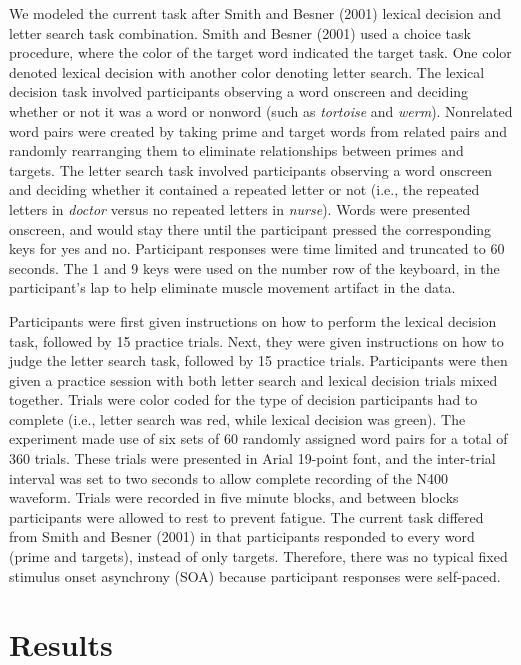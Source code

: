 \documentclass[english,man]{apa6}
\theoremstyle{definition}
\theoremstyle{definition}
\theoremstyle{definition}
\theoremstyle{remark}
\begin{document}
We modeled the current task after Smith and Besner (2001) lexical
decision and letter search task combination. Smith and Besner (2001)
used a choice task procedure, where the color of the target word
indicated the target task. One color denoted lexical decision with
another color denoting letter search. The lexical decision task involved
participants observing a word onscreen and deciding whether or not it
was a word or nonword (such as \emph{tortoise} and \emph{werm}).
Nonrelated word pairs were created by taking prime and target words from
related pairs and randomly rearranging them to eliminate relationships
between primes and targets. The letter search task involved participants
observing a word onscreen and deciding whether it contained a repeated
letter or not (i.e., the repeated letters in \emph{doctor} versus no
repeated letters in \emph{nurse}). Words were presented onscreen, and
would stay there until the participant pressed the corresponding keys
for yes and no. Participant responses were time limited and truncated to
60 seconds. The 1 and 9 keys were used on the number row of the
keyboard, in the participant's lap to help eliminate muscle movement
artifact in the data.

Participants were first given instructions on how to perform the lexical
decision task, followed by 15 practice trials. Next, they were given
instructions on how to judge the letter search task, followed by 15
practice trials. Participants were then given a practice session with
both letter search and lexical decision trials mixed together. Trials
were color coded for the type of decision participants had to complete
(i.e., letter search was red, while lexical decision was green). The
experiment made use of six sets of 60 randomly assigned word pairs for a
total of 360 trials. These trials were presented in Arial 19-point font,
and the inter-trial interval was set to two seconds to allow complete
recording of the N400 waveform. Trials were recorded in five minute
blocks, and between blocks participants were allowed to rest to prevent
fatigue. The current task differed from Smith and Besner (2001) in that
participants responded to every word (prime and targets), instead of
only targets. Therefore, there was no typical fixed stimulus onset
asynchrony (SOA) because participant responses were self-paced.

\section{Results}\label{results}
\end{document}
